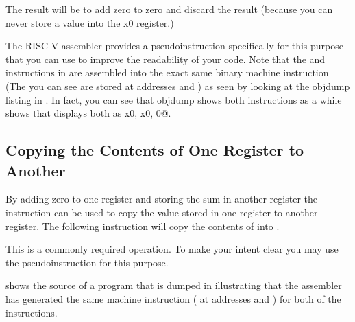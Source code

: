 
The result will be to add zero to zero and discard the result (because you
can never store a value into the x0 register.)

The RISC-V assembler provides a pseudoinstruction specifically for this 
purpose that you can use to improve the readability of your code.  Note 
that the  and  instructions in 
are assembled into the exact same binary machine instruction (The
 you can see are stored at addresses  and )
as seen by looking at the objdump listing in .
In fact, you can see that objdump shows both instructions as a 
while  shows that \rvddt{} displays both as 
\verb@addi x0, x0, 0@.  





\subsection{Copying the Contents of One Register to Another}

By adding zero to one register and storing the sum in another register
the  instruction can be used to copy the value stored in one
register to another register.  The following instruction will copy
the contents of  into .


This is a commonly required operation.  To make your intent clear
you may use the  pseudoinstruction for this purpose.  

 shows the source of a program that is dumped in 
 illustrating that the assembler has generated the
same machine instruction ( at addresses  and ) 
for both of the instructions.


